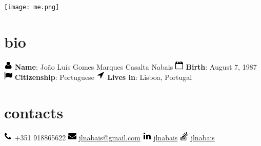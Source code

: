 \documentclass[]{friggeri-cv} %
\begin{document}


\begin{aside} %
\texttt{[image: me.png]} 
\section{bio}
\includegraphics[scale=0.5, left]{USER.png}
\vspace{-5mm} \textbf{Name}: João Luís Gomes Marques Casalta Nabais
\includegraphics[scale=0.5, left]{calendar.png}
\vspace{-5mm} \textbf{Birth}: August 7, 1987
\includegraphics[scale=0.5, left]{flag.png}
\vspace{-5mm} \textbf{Citizenship}: Portuguese
\includegraphics[scale=0.5, left]{location.png} 
\vspace{-5mm} \textbf{Lives in}: Lisboa, Portugal
\section{contacts}
\includegraphics[scale=0.5, left]{phone.png} 
\vspace{-5mm} +351 918865622
\includegraphics[scale=0.5, left]{envelope.png}
\vspace{-5mm} \href{mailto:jlnabais@gmail.com}{jlnabais@gmail.com}
\includegraphics[scale=0.5, left]{linkedin.png} 
\vspace{-5mm} \href{http://www.linkedin.com/in/jlnabais}{jlnabais}
\includegraphics[scale=0.5, left]{stackoverflow.png}
\vspace{-5mm} \href{https://stackoverflow.com/users/5145800/jlnabais?tab=profile}{jlnabais}

\end{aside}
\end{document}
